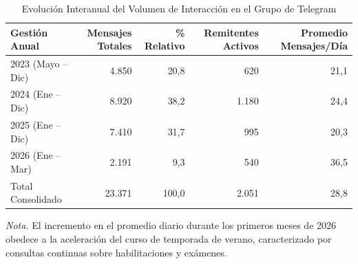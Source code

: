 \begin{table}[htbp]
  \centering
  \small
  \caption{Evolución Interanual del Volumen de Interacción en el Grupo de Telegram}
  \label{tab:mensajes_por_anio}
  \begin{tabular}{lrrrr}
    \toprule
    Gestión Anual & Mensajes Totales & \% Relativo & Remitentes Activos & Promedio Mensajes/Día \\
    \midrule
    2023 (Mayo -- Dic) & 4.850 & 20,8 & 620   & 21,1 \\
    2024 (Ene -- Dic)  & 8.920 & 38,2 & 1.180 & 24,4 \\
    2025 (Ene -- Dic)  & 7.410 & 31,7 & 995   & 20,3 \\
    2026 (Ene -- Mar)  & 2.191 & 9,3  & 540   & 36,5 \\
    \midrule
    Total Consolidado  & 23.371& 100,0& 2.051 & 28,8 \\
    \bottomrule
  \end{tabular}
  \vspace{4pt}
  \begin{minipage}{0.92\textwidth}
    \footnotesize
    \textit{Nota.} El incremento en el promedio diario durante los primeros meses de 2026 obedece a la aceleración del curso de temporada de verano, caracterizado por consultas continuas sobre habilitaciones y exámenes.
  \end{minipage}
\end{table}
